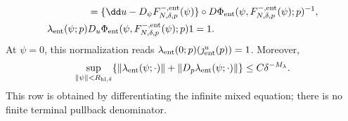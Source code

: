 \begin{lemma}
\begin{align}
 &=\{\dd u-D_\psi F^{-,\rm ent}_{N,\delta,p}(\psi)\}
     \circ D\Phi_{\rm ent}
       (\psi,F^{-,\rm ent}_{N,\delta,p}(\psi);p)^{-1},\notag\\
 \lambda_{\rm ent}(\psi;p)&
   D_u\Phi_{\rm ent}
       (\psi,F^{-,\rm ent}_{N,\delta,p}(\psi);p)1=1.   \label{eq:anchor-dual-row-pullback}
\end{align}
At \(\psi=0\), this normalization reads
\(\lambda_{\rm ent}(0;p)(\jmath_{\rm ent}^u(p))=1\).
Moreover,
\begin{equation}
 \sup_{\|\psi\|<R_{\mathrm{hl},\delta}}
 \{\|\lambda_{\rm ent}(\psi;\cdot)\|
       +\|D_p\lambda_{\rm ent}(\psi;\cdot)\|\}
 \le C\delta^{-M_\lambda}.                           \label{eq:anchor-half-line-conormal-bound}
\end{equation}
This row is obtained by differentiating the infinite mixed equation; there
is no finite terminal pullback denominator.


\end{lemma}
